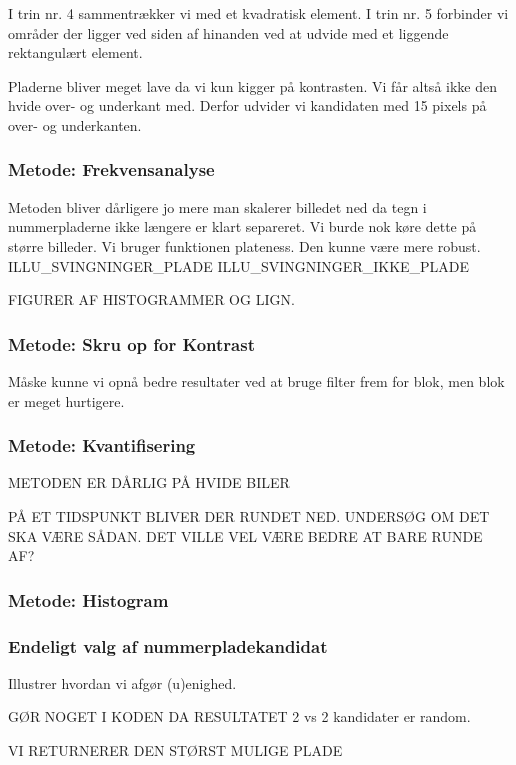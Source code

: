 I trin nr. 4 sammentrækker vi med et kvadratisk element. I trin nr. 5 forbinder vi områder der ligger ved siden af hinanden ved at udvide med et liggende rektangulært element. 



Pladerne bliver meget lave da vi kun kigger på kontrasten. Vi får altså ikke den hvide over- og underkant med. Derfor udvider vi kandidaten med 15 pixels på over- og underkanten. 

\subsubsection{Metode: Frekvensanalyse}
Metoden bliver dårligere jo mere man skalerer billedet ned da tegn i nummerpladerne ikke længere er klart separeret. Vi burde nok køre dette på større billeder.
Vi bruger funktionen plateness. Den kunne være mere robust.
ILLU\_SVINGNINGER\_PLADE ILLU\_SVINGNINGER\_IKKE\_PLADE

FIGURER AF HISTOGRAMMER OG LIGN.


\subsubsection{Metode: Skru op for Kontrast}
Måske kunne vi opnå bedre resultater ved at bruge filter frem for blok, men blok er meget hurtigere.

\subsubsection{Metode: Kvantifisering}

METODEN ER DÅRLIG PÅ HVIDE BILER

PÅ ET TIDSPUNKT BLIVER DER RUNDET NED. UNDERSØG OM DET SKA VÆRE SÅDAN. DET VILLE VEL VÆRE BEDRE AT BARE RUNDE AF?


\subsubsection{Metode: Histogram}

\subsubsection{Endeligt valg af nummerpladekandidat}
Illustrer hvordan vi afgør (u)enighed. 

GØR NOGET I KODEN DA RESULTATET 2 vs 2 kandidater er random.

VI RETURNERER DEN STØRST MULIGE PLADE

